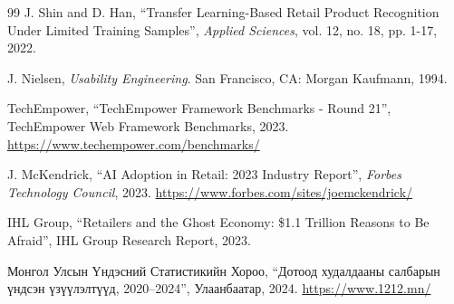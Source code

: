 \documentclass[12pt,a4paper]{report}
\renewcommand{\arraystretch}{1.3}
\begin{document}
\begin{thebibliography}{99}
    J. Shin and D. Han, ``Transfer Learning-Based Retail Product Recognition Under Limited Training Samples'', \textit{Applied Sciences}, vol. 12, no. 18, pp. 1-17, 2022.

    J. Nielsen, \textit{Usability Engineering}. San Francisco, CA: Morgan Kaufmann, 1994.
    
    TechEmpower, ``TechEmpower Framework Benchmarks - Round 21'', TechEmpower Web Framework Benchmarks, 2023. \url{https://www.techempower.com/benchmarks/}
    
    J. McKendrick, ``AI Adoption in Retail: 2023 Industry Report'', \textit{Forbes Technology Council}, 2023. \url{https://www.forbes.com/sites/joemckendrick/}
    
    IHL Group, ``Retailers and the Ghost Economy: \$1.1 Trillion Reasons to Be Afraid'', IHL Group Research Report, 2023.

    Монгол Улсын Үндэсний Статистикийн Хороо, ``Дотоод худалдааны салбарын үндсэн үзүүлэлтүүд, 2020--2024'', Улаанбаатар, 2024. \url{https://www.1212.mn/}
\end{thebibliography}
\endgroup


\appendix
{}
\renewcommand{\arraystretch}{1.15}

\end{document}
